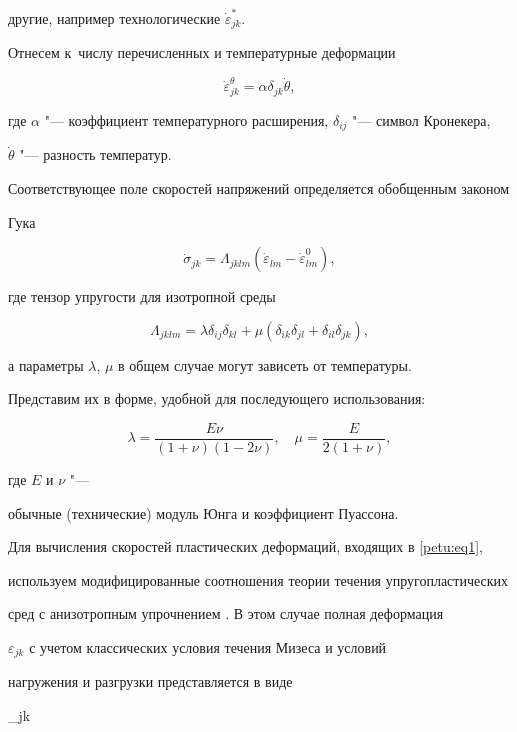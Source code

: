 другие, например технологические $\dot {\varepsilon }_{jk}^\ast $. 

Отнесем к~числу перечисленных и температурные деформации 

$$\dot {\varepsilon }_{jk}^\theta =\alpha \delta _{jk} \dot {\theta },$$ 

где $\alpha$ "--- коэффициент температурного расширения, $\delta _{ij}$ "--- символ Кронекера,

$\dot {\theta }$ "--- разность температур.



Соответствующее поле скоростей напряжений определяется обобщенным законом

Гука

\begin{equation}

\label{petu:eq2}

\dot {\sigma }_{jk} =\Lambda _{jklm} \left(\dot {\varepsilon }_{lm} -\dot

{\varepsilon }_{lm}^0 \right),

\end{equation}

где тензор упругости для изотропной среды 

$$\Lambda _{jklm} =\lambda \delta _{ij} \delta _{kl} +\mu (\delta _{ik} \delta _{jl} +\delta _{il} \delta

_{jk} ),$$ 

а параметры $\lambda$, $\mu $ в общем случае могут зависеть от температуры. 

Представим их в форме, удобной для последующего использования:

$$\lambda =\frac {E\nu}{(1+\nu )(1-2\nu )},\quad  \mu =\frac E {2(1+\nu )},$$ 

где $E$ и $\nu$ "---

обычные (технические) модуль Юнга и коэффициент Пуассона.



Для вычисления скоростей пластических деформаций, входящих в \eqref{petu:eq1},

используем модифицированные соотношения теории течения упругопластических

сред с анизотропным упрочнением \cite{petu:bib13,petu:bib14}. В этом случае полная деформация

$\varepsilon _{jk} $ с учетом классических условия течения Мизеса и условий

нагружения и разгрузки представляется в виде 

$$\varepsilon _{jk}


